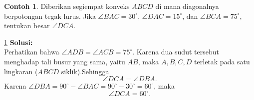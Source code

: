 \documentclass[aspectratio=169]{beamer}
\theoremstyle{definition}
\newtheorem{contoh}{Contoh}
\newcommand{\myref}[1]{\hyperref[#1]{\nameCref{#1} \ref*{#1}}}
\begin{document}
\begin{frame}{\insertsection}
  \begin{contoh}
    Diberikan segiempat konveks $ABCD$ di mana diagonalnya berpotongan tegak lurus. Jika $\angle BAC = 30^\circ$, $\angle DAC = 15^\circ$, dan $\angle BCA = 75^\circ$, tentukan besar $\angle DCA$.\label{cth:segi4_siklik}

    \begin{center}
    \end{center}
  \end{contoh}
\end{frame}

\begin{frame}{\insertsection}
  \begin{exampleblock}{\myref{cth:segi4_siklik}}
    \textbf{Solusi:}\\
    Perhatikan bahwa
    $
      \angle ADB=\angle ACB=75^\circ.
    $
    Karena dua sudut tersebut menghadap tali busur yang sama, yaitu $AB$, maka $A,B,C,D$ terletak pada satu lingkaran ($ABCD$ siklik).Sehingga
    \[
      \angle DCA=\angle DBA.
    \]
    Karena $\angle DBA=90^\circ-\angle BAC=90^\circ-30^\circ=60^\circ$, maka
    \[
      \angle DCA=60^\circ.
    \]
  \end{exampleblock}
\end{frame}
\end{document}
